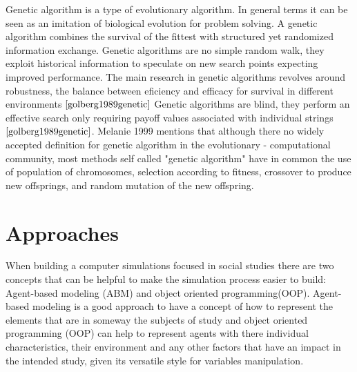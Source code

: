 Genetic algorithm is a type of evolutionary algorithm. In general terms it can be seen as an imitation of biological evolution for problem solving. A genetic algorithm combines the survival of the fittest with  structured yet randomized information exchange. Genetic algorithms are no simple random walk, they exploit historical information to speculate on new search points expecting improved performance. The main research in genetic algorithms revolves around robustness, the balance between eficiency and efficacy for survival in different environments $\cite{golberg1989genetic}$ Genetic algorithms are blind, they perform an effective search only requiring payoff values associated with individual strings $\cite{golberg1989genetic}$.  Melanie 1999 mentions that although there no widely accepted definition for genetic algorithm in the evolutionary - computational community, most methods self called "genetic algorithm" have in common the use of population of chromosomes, selection according to fitness, crossover to produce new offsprings, and random mutation of the new offspring.  

\section{Approaches} \label{ABMOOP}
When building a computer simulations focused in social studies there are two concepts that can be helpful to make the simulation process easier to build: Agent-based modeling (ABM) and object oriented programming(OOP). Agent-based modeling is a good approach to have a concept of how to represent the elements that are in someway the subjects of study and object oriented programming (OOP) can help to represent agents with there individual characteristics, their environment and any other factors that have an impact in the intended study, given its versatile style for variables manipulation.
